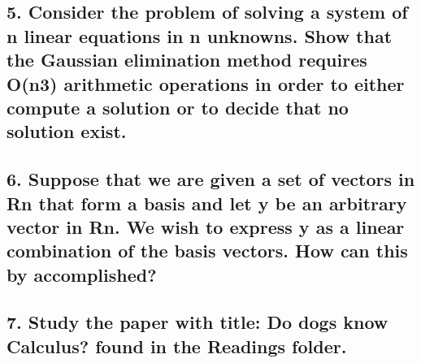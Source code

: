 \documentclass[12pt]{article}
\begin{document}
\pagebreak

\subsection*{5. Consider the problem of solving a system of n linear equations in n unknowns. Show
that the Gaussian elimination method requires O(n3) arithmetic operations in order to either
compute a solution or to decide that no solution exist.}

\vspace{2in}

\pagebreak

\subsection*{6. Suppose that we are given a set of vectors in Rn that form a basis and let y be an
arbitrary vector in Rn. We wish to express y as a linear combination of the basis vectors. How
can this by accomplished?}

\vspace{2in}

\pagebreak

\subsection*{7. Study the paper with title: Do dogs know Calculus? found in the Readings folder.}

\vspace{2in}

\pagebreak
\end{document}
